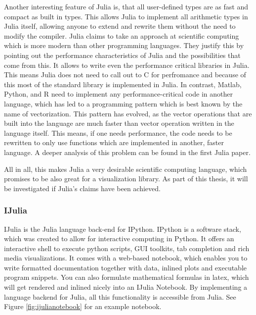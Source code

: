 Another interesting feature of Julia is, that all user-defined types are as fast and compact as built in types.
This allows Julia to implement all arithmetic types in Julia itself, allowing anyone to extend and rewrite them without the need to modify the compiler.
Julia claims to take an approach at scientific computing which is more modern than other programming languages.
They justify this by pointing out the performance characteristics of Julia and the possibilities that come from this\cite{2013arXiv1312.1431L}\cite{2012arXiv1209.5145B}. 
It allows to write even the performance critical libraries in Julia. 
This means Julia does not need to call out to C for perfromance and because of this most of the standard library is implemented in Julia.
In contrast, Matlab, Python, and R need to implement any performance-critical code in another language, which has led to a programming pattern which is best known by the name of vectorization. This pattern has evolved, as the vector operations that are built into the language are much faster than vector operation written in the language itself.
This means, if one needs performance, the code needs to be rewritten to only use functions which are implemented in another, faster language.
A deeper analysis of this problem can be found in the first Julia paper\cite{2012arXiv1209.5145B}.

All in all, this makes Julia a very desirable scientific computing language, which promises to be also great for a visualization library.
As part of this thesis, it will be investigated if Julia's claims\cite{WhyJulia} have been achieved.



\subsubsection{IJulia}
IJulia is the Julia language back-end for IPython.
IPython is a software stack, which was created to allow for interactive computing in Python.
It offers an interactive shell to execute python scripts, \ac{GUI} toolkits, tab completion and rich media visualizations.
It comes with a web-based notebook, which enables you to write formatted documentation together with data, inlined plots and executable program snippets. You can also formulate mathematical formulas in latex, which will get rendered and inlined nicely into an IJulia Notebook. By implementing a language backend for Julia, all this functionality is accessible from Julia.
See Figure \ref{fig:ijulianotebook} for an example notebook.

